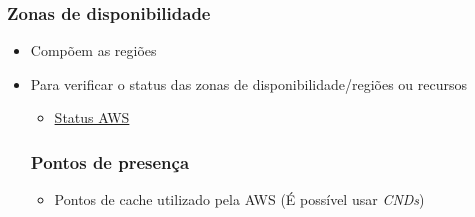 \begin{frame}
	\frametitle{Zonas de disponibilidade}
	\begin{itemize}
		\item Compõem as regiões
		\item Para verificar o status das zonas de disponibilidade/regiões ou recursos
			\begin{itemize}
				\item \href{http://status.aws.amazon.com/}{Status AWS}
			\end{itemize}
	\frametitle{Pontos de presença}
	\begin{itemize}
		\item Pontos de cache utilizado pela AWS (É possível usar \textit{CNDs})
	\end{itemize}
	\end{itemize}
\end{frame}

